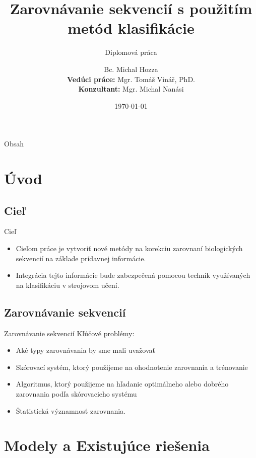 \documentclass[xcolor=dvipsnames, compress, 12pt]{beamer}
\title{Zarovnávanie sekvencií s použitím metód klasifikácie}
\subtitle{
\vspace{0.5cm}
\small Diplomová práca
}
\author[Michal Hozza]{\small Bc. Michal Hozza \\ \vspace{1cm} \footnotesize \textbf{Vedúci práce:} Mgr. Tomáš Vinář, PhD. \\ \textbf{Konzultant:} Mgr. Michal Nanási\\ \vspace{.5cm}}
\institute[FMFI UK \insertshortdate]{
  Fakulta matematiky, fyziky a informatiky,
  Univerzita Komenského, Bratislava\\
}
\date[\the\year]{\footnotesize \today}
\begin{document}
\begin{frame}[plain]
  \titlepage
\end{frame}


\begin{frame}{Obsah}
  \transdissolve[duration=0.1]
  \tableofcontents
\end{frame}


\section{Úvod}
\subsection{Cieľ}
\begin{frame}{Cieľ}
  \begin{itemize}
  \item Cieľom práce je vytvoriť nové metódy na korekciu zarovnaní biologických sekvencií na základe prídavnej informácie.
  \item Integrácia tejto informácie bude zabezpečená pomocou techník využívaných na klasifikáciu v strojovom učení.
  \end{itemize} 
\end{frame}


\subsection{Zarovnávanie sekvencií}
\begin{frame}{Zarovnávanie sekvencií}
Kľúčové problémy:
  \begin{itemize}
    \pause
    \item Aké typy zarovnávania by sme mali uvažovať
    \pause
    \item Skórovací systém, ktorý použijeme na ohodnotenie zarovnania a trénovanie
    \pause
    \item Algoritmus, ktorý použijeme na hľadanie optimálneho alebo dobrého zarovnania podľa skórovacieho systému
    \pause
    \item Štatistická významnosť zarovnania.
  \end{itemize} 
\end{frame}

\section{Modely a Existujúce riešenia}
\end{document}
